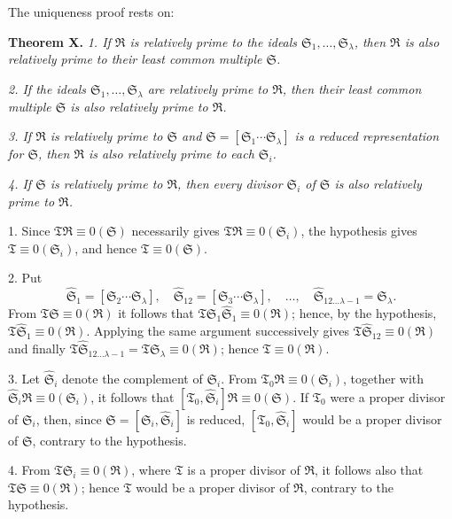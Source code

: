 \documentclass[11pt]{article}
\newcommand{\ideal}[1]{\mathfrak{#1}}
\begin{document}
The uniqueness proof rests on:

\textbf{Theorem X.} \emph{1. If $\ideal R$ is relatively prime to the ideals $\ideal S_1,
\ldots,\ideal S_\lambda$, then $\ideal R$ is also relatively prime to their least common multiple $\ideal S$.}

\emph{2. If the ideals $\ideal S_1,
\ldots,\ideal S_\lambda$ are relatively prime to $\ideal R$, then their least common multiple $\ideal S$ is also relatively prime to $\ideal R$.}

\emph{3. If $\ideal R$ is relatively prime to $\ideal S$ and $\ideal S=[\ideal S_1\cdots\ideal S_\lambda]$ is a reduced representation for $\ideal S$, then $\ideal R$ is also relatively prime to each $\ideal S_i$.}

\emph{4. If $\ideal S$ is relatively prime to $\ideal R$, then every divisor $\ideal S_i$ of $\ideal S$ is also relatively prime to $\ideal R$.}

1. Since $\ideal T\ideal R\equiv0(\ideal S)$ necessarily gives $\ideal T\ideal R\equiv0(\ideal S_i)$, the hypothesis gives $\ideal T\equiv0(\ideal S_i)$, and hence $\ideal T\equiv0(\ideal S)$.

2. Put
\[
 \widehat{\ideal S}_1=[\ideal S_2\cdots\ideal S_\lambda],\quad
 \widehat{\ideal S}_{12}=[\ideal S_3\cdots\ideal S_\lambda],\quad \ldots,\quad
 \widehat{\ideal S}_{12\ldots\lambda-1}=\ideal S_\lambda.
\]
From $\ideal T\ideal S\equiv0(\ideal R)$ it follows that $\ideal T\ideal S_1\widehat{\ideal S}_1\equiv0(\ideal R)$; hence, by the hypothesis, $\ideal T\widehat{\ideal S}_1\equiv0(\ideal R)$. Applying the same argument successively gives $\ideal T\widehat{\ideal S}_{12}\equiv0(\ideal R)$ and finally $\ideal T\widehat{\ideal S}_{12\ldots\lambda-1}=\ideal T\ideal S_\lambda\equiv0(\ideal R)$; hence $\ideal T\equiv0(\ideal R)$.

3. Let $\widehat{\ideal S}_i$ denote the complement of $\ideal S_i$. From $\ideal T_0\ideal R\equiv0(\ideal S_i)$, together with $\widehat{\ideal S}_i\ideal R\equiv0(\ideal S_i)$, it follows that $[\ideal T_0,
\widehat{\ideal S}_i]\ideal R\equiv0(\ideal S)$. If $\ideal T_0$ were a proper divisor of $\ideal S_i$, then, since $\ideal S=[\ideal S_i,
\widehat{\ideal S}_i]$ is reduced, $[\ideal T_0,
\widehat{\ideal S}_i]$ would be a proper divisor of $\ideal S$, contrary to the hypothesis.

4. From $\ideal T\ideal S_i\equiv0(\ideal R)$, where $\ideal T$ is a proper divisor of $\ideal R$, it follows also that $\ideal T\ideal S\equiv0(\ideal R)$; hence $\ideal T$ would be a proper divisor of $\ideal R$, contrary to the hypothesis.
\end{document}
